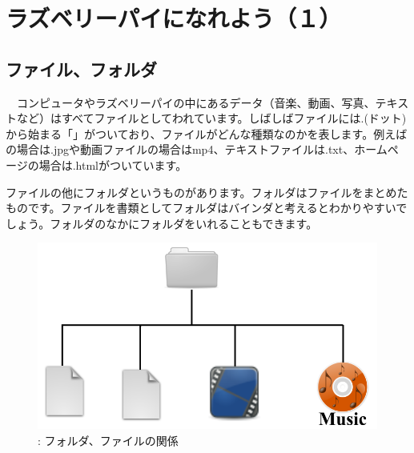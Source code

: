 \documentclass[a4paper,12pt]{jarticle}
\begin{document}
\section{ラズベリーパイになれよう（１）}
\subsection{ファイル、フォルダ}
\ \ コンピュータやラズベリーパイの中にあるデータ（音楽、動画、写真、テキストなど）はすべてファイルとしてわれています。しばしばファイルには.(ドット)から始まる「」がついており、ファイルがどんな種類なのかを表します。例えばの場合は.jpgや動画ファイルの場合はmp4、テキストファイルは.txt、ホームページの場合は.htmlがついています。

ファイルの他にフォルダというものがあります。フォルダはファイルをまとめたものです。ファイルを書類としてフォルダはバインダと考えるとわかりやすいでしょう。フォルダのなかにフォルダをいれることもできます。



\begin{figure}[hb]
  \centering
  \begin{minipage}{0.76\textwidth}


    \includegraphics[width=\linewidth]{figure15.png}
    {\upshape
      \newline
      :
      フォルダ、ファイルの関係}
  \end{minipage}
\end{figure}
\end{document}
